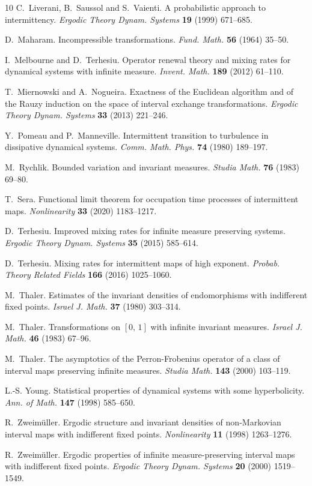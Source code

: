 \documentclass[12pt]{article}
\numberwithin{equation}{section}
\begin{document}
\begin{thebibliography}{10}
C.~Liverani, B.~Saussol and S.~Vaienti. {A probabilistic approach to
  intermittency}. \emph{Ergodic Theory Dynam. Systems} \textbf{19} (1999)
  671--685.

D.~Maharam. Incompressible transformations. \emph{Fund. Math.} \textbf{56}
  (1964) 35--50.

I.~Melbourne and D.~Terhesiu. {Operator renewal theory and mixing rates for
  dynamical systems with infinite measure}. \emph{Invent. Math.} \textbf{189}
  (2012) 61--110.

T.~Miernowski and A.~Nogueira. Exactness of the {E}uclidean algorithm and of
  the {R}auzy induction on the space of interval exchange transformations.
  \emph{Ergodic Theory Dynam. Systems} \textbf{33} (2013) 221--246.

Y.~Pomeau and P.~Manneville. Intermittent transition to turbulence in
  dissipative dynamical systems. \emph{Comm. Math. Phys.} \textbf{74} (1980)
  189--197.

M.~Rychlik. Bounded variation and invariant measures. \emph{Studia Math.}
  \textbf{76} (1983) 69--80.

T.~Sera. Functional limit theorem for occupation time processes of intermittent
  maps. \emph{Nonlinearity} \textbf{33} (2020) 1183--1217.

D.~Terhesiu. {Improved mixing rates for infinite measure preserving systems}.
  \emph{Ergodic Theory Dynam. Systems} \textbf{35} (2015) 585--614.

D.~Terhesiu. Mixing rates for intermittent maps of high exponent. \emph{Probab.
  Theory Related Fields} \textbf{166} (2016) 1025--1060.

M.~Thaler. Estimates of the invariant densities of endomorphisms with
  indifferent fixed points. \emph{Israel J. Math.} \textbf{37} (1980)
  303--314.

M.~Thaler. Transformations on {$[0,\,1]$} with infinite invariant measures.
  \emph{Israel J. Math.} \textbf{46} (1983) 67--96.

M.~Thaler. The asymptotics of the {P}erron-{F}robenius operator of a class of
  interval maps preserving infinite measures. \emph{Studia Math.} \textbf{143}
  (2000) 103--119.

L.-S. Young. Statistical properties of dynamical systems with some
  hyperbolicity. \emph{Ann. of Math.} \textbf{147} (1998) 585--650.

R.~Zweim{\"u}ller. Ergodic structure and invariant densities of non-{M}arkovian
  interval maps with indifferent fixed points. \emph{Nonlinearity} \textbf{11}
  (1998) 1263--1276.

R.~Zweim{\"u}ller. Ergodic properties of infinite measure-preserving interval
  maps with indifferent fixed points. \emph{Ergodic Theory Dynam. Systems}
  \textbf{20} (2000) 1519--1549.

\end{thebibliography}
\end{document}
